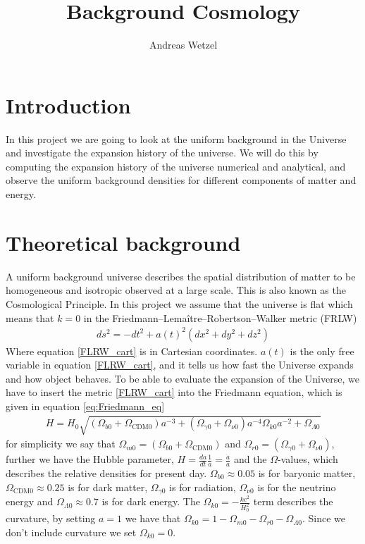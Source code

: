 \documentclass{article}
\begin{document}
\title{{Background Cosmology}}
\author{{Andreas Wetzel}}

\maketitle
\begin{multicols}{2}
\section{Introduction}
In this project we are going to look at the uniform background in the Universe and investigate the expansion history of the universe. We will do this by computing the expansion history of the universe numerical and analytical, and observe the uniform background densities for different components of matter and energy.  
\section{Theoretical background}
A uniform background universe describes the spatial distribution of matter to be homogeneous and isotropic observed at a large scale. This is also known as the Cosmological Principle. In this project we assume that the universe is flat which means that $k=0$ in the Friedmann–Lemaître–Robertson–Walker metric (FRLW)
\begin{align}
    ds^2 =-dt^2+a(t)^2(dx^2+dy^2+dz^2)\label{FLRW_cart}
\end{align}
Where equation \eqref{FLRW_cart} is in Cartesian coordinates. $a(t)$ is the only free variable in equation \eqref{FLRW_cart}, and it tells us how fast the Universe expands and how object behaves. To be able to evaluate the expansion of the Universe, we have to insert the metric \eqref{FLRW_cart} into the Friedmann equation, which is given in equation \eqref{eq:Friedmann_eq}
\begin{align}
    H=H_0\sqrt{(\Omega_{b0}+\Omega_{\text{CDM}0})a^{-3}+(\Omega_{\gamma0}+\Omega_{\nu0})a^{-4}\Omega_{k0}a^{-2}+\Omega_{\Lambda0}} \label{eq:Friedmann_eq}
\end{align}
for simplicity we say that $\Omega_{m0}=(\Omega_{b0}+\Omega_{\text{CDM}0})$ and $\Omega_{r0}=(\Omega_{\gamma0}+\Omega_{\nu0})$, further we
have the Hubble parameter, $H=\frac{da}{dt}\frac{1}{a}=\frac{\Dot{a}}{a}$ and the $\Omega$-values, which describes the relative densities for present day. $\Omega_{b0}\approx 0.05$ is for baryonic matter, $\Omega_{\text{CDM}0}\approx 0.25$ is for dark matter, $\Omega_{\gamma0}$ is for radiation, $\Omega_{\nu0}$ is for the neutrino energy and $\Omega_{\Lambda 0}\approx 0.7$ is for dark energy. The $\Omega_{k0}=-\frac{kc^2}{H_0^2}$ term describes the curvature, by setting $a=1$ we have that $\Omega_{k0}=1-\Omega_{m0}-\Omega_{r0}-\Omega_{\Lambda0}$. Since we don't include curvature we set $\Omega_{k0}=0$. 

\end{multicols}
\end{document}

